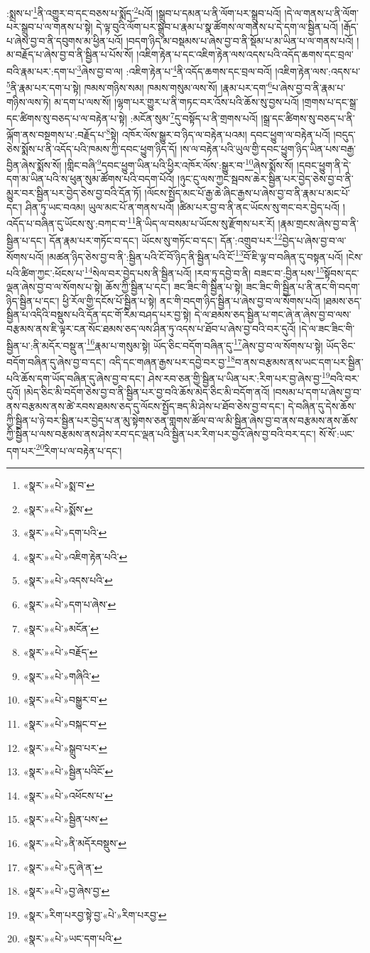 :སྨྲས་པ་\footnote{«སྣར་»«པེ་»སྨ་བ་}ནི་འགྱུར་བ་དང་བཅས་པ་སྨོད་\footnote{«སྣར་»«པེ་»སྨོས་}པའོ། །སྒྲུབ་པ་དམན་པ་ནི་ལོག་པར་སྒྲུབ་པའོ། །དེ་ལ་གནས་པ་ནི་ལོག་པར་སྒྲུབ་པ་ལ་གནས་པ་སྟེ། དེ་ལྟ་བུའི་ལོག་པར་སྒྲུབ་པ་རྣམ་པ་སྣ་ཚོགས་ལ་གནས་པ་དེ་དག་ལ་སྦྱིན་པའོ། །རྒོད་པ་ཞེས་བྱ་བ་ནི་དབུགས་མ་ཕྱིན་པའོ། །བདག་ཉིད་མ་བསྡམས་པ་ཞེས་བྱ་བ་ནི་སྡོམ་པ་མ་ཡིན་པ་ལ་གནས་པའོ། །མ་བརྗོད་པ་ཞེས་བྱ་བ་ནི་སྦྱིན་པ་པོས་སོ། །འཇིག་རྟེན་པ་དང་འཇིག་རྟེན་ལས་འདས་པའི་འདོད་ཆགས་དང་བྲལ་བའི་རྣམ་པར་:དག་པ་\footnote{«སྣར་»«པེ་»དག་པའི་}ཞེས་བྱ་བ་ལ། :འཇིག་རྟེན་པ་\footnote{«སྣར་»«པེ་»འཇིག་རྟེན་པའི་}ནི་འདོད་ཆགས་དང་བྲལ་བའོ། །འཇིག་རྟེན་ལས་:འདས་པ་\footnote{«སྣར་»«པེ་»འདས་པའི་}ནི་རྣམ་པར་དག་པ་སྟེ། ཁམས་གཉིས་སམ། ཁམས་གསུམ་ལས་སོ། །རྣམ་པར་དག་\footnote{«སྣར་»«པེ་»དག་པ་ཞེས་}པ་ཞེས་བྱ་བ་ནི་རྣམ་པ་གཉིས་ལས་ཏེ། མ་དག་པ་ལས་སོ། །ལྷག་པར་གྱུར་པ་ནི་གཏང་བར་འོས་པའི་ཆོས་སུ་བྱས་པའོ། །གྲགས་པ་དང་སྒྲ་དང་ཚིགས་སུ་བཅད་པ་ལ་བརྟེན་པ་སྟེ། :མངོན་སུམ་\footnote{«སྣར་»«པེ་»མངོན་}དུ་བསྟོད་པ་ནི་གྲགས་པའོ། །སྒྲ་དང་ཚིགས་སུ་བཅད་པ་ནི་ལྐོག་ནས་བསྔགས་པ་:བརྗོད་པ་\footnote{«སྣར་»«པེ་»བརྗོད་}སྟེ། འཁོར་ལོས་སྒྱུར་བ་ཉིད་ལ་བརྟེན་པའམ། དབང་ཕྱུག་ལ་བརྟེན་པའོ། །བདུད་ཅེས་སྨོས་པ་ནི་འདོད་པའི་ཁམས་ཀྱི་དབང་ཕྱུག་ཉིད་དོ། །ས་ལ་བརྟེན་པའི་ཡུལ་གྱི་དབང་ཕྱུག་ཉིད་ཡིན་པས་བརྒྱ་བྱིན་ཞེས་སྨོས་སོ། །གླིང་བཞི་\footnote{«སྣར་»«པེ་»གཞིའི་}དབང་ཕྱུག་ཡིན་པའི་ཕྱིར་འཁོར་ལོས་:སྒྱུར་བ་\footnote{«སྣར་»«པེ་»བསྒྱུར་བ་}ཞེས་སྨོས་སོ། །དབང་ཕྱུག་ནི་དེ་དག་མ་ཡིན་པའི་ས་ཕུན་སུམ་ཚོགས་པའི་བདག་པོའོ། །ཉུང་ངུ་ལས་ཀྱང་སྦབས་ཆེར་སྦྱིན་པར་བྱེད་ཅེས་བྱ་བ་ནི་མྱུར་བར་སྦྱིན་པར་བྱེད་ཅེས་བྱ་བའི་དོན་ཏོ། །ལོངས་སྤྱོད་མང་པོ་རྒྱ་ཆེ་ཞིང་རྒྱས་པ་ཞེས་བྱ་བ་ནི་རྣམ་པ་མང་པོ་དང་། ཤིན་ཏུ་ཡང་བའམ། ཡུལ་མང་པོ་ན་གནས་པའོ། །ཚིམ་པར་བྱ་བ་ནི་ནང་ཡོངས་སུ་གང་བར་བྱེད་པའོ། །འདོད་པ་བཞིན་དུ་ཡོངས་སུ་:བཀང་བ་\footnote{«སྣར་»«པེ་»བསྐང་བ་}ནི་ཡིད་ལ་བསམ་པ་ཡོངས་སུ་རྫོགས་པར་རོ། །རྣམ་གྲངས་ཞེས་བྱ་བ་ནི་སྦྱིན་པ་དང་། དོན་རྣམ་པར་གཏོང་བ་དང་། ཡོངས་སུ་གཏོང་བ་དང་། དོན་:འགྲུབ་པར་\footnote{«སྣར་»«པེ་»སྒྲུབ་པར་}བྱེད་པ་ཞེས་བྱ་བ་ལ་སོགས་པའོ། །མཚན་ཉིད་ཅེས་བྱ་བ་ནི་:སྦྱིན་པའི་ངོ་བོ་ཉིད་ནི་སྦྱིན་པའི་ངོ་\footnote{«སྣར་»«པེ་»སྦྱིན་པའིངོ་}བོ་ཇི་ལྟ་བ་བཞིན་དུ་བསྟན་པའོ། །ངེས་པའི་ཚིག་ཀྱང་:ཕོངས་པ་\footnote{«སྣར་»«པེ་»འཕོངས་པ་}སེལ་བར་བྱེད་པས་ནི་སྦྱིན་པའོ། །རབ་ཏུ་དབྱེ་བ་ནི། བཟང་བ་:བྱིན་པས་\footnote{«སྣར་»«པེ་»སྦྱིན་པས་}སྟོབས་དང་ལྡན་ཞེས་བྱ་བ་ལ་སོགས་པ་སྟེ། ཆོས་ཀྱི་སྦྱིན་པ་དང་། ཟང་ཟིང་གི་སྦྱིན་པ་སྟེ། ཟང་ཟིང་གི་སྦྱིན་པ་ནི་ནང་གི་བདག་ཉིད་སྦྱིན་པ་དང་། ཕྱི་རོལ་གྱི་དངོས་པོ་སྦྱིན་པ་སྟེ། ནང་གི་བདག་ཉིད་སྦྱིན་པ་ཞེས་བྱ་བ་ལ་སོགས་པའོ། །ཐམས་ཅད་སྦྱིན་པ་འདིའི་བསྡུས་པའི་དོན་དང་གོ་རིམ་བཤད་པར་བྱ་སྟེ། དེ་ལ་ཐམས་ཅད་སྦྱིན་པ་གང་ཞེ་ན་ཞེས་བྱ་བ་ལས་བརྩམས་ནས་ཇི་ལྟར་ངན་སོང་ཐམས་ཅད་ལས་ཤིན་ཏུ་འདས་པ་ཐོབ་པ་ཞེས་བྱ་བའི་བར་དུའོ། །དེ་ལ་ཟང་ཟིང་གི་སྦྱིན་པ་:ནི་མདོར་བསྡུ་ན་\footnote{«སྣར་»«པེ་»ནི་མདོརབསྡུས་}རྣམ་པ་གསུམ་སྟེ། ཡོད་ཅིང་བདོག་བཞིན་དུ་\footnote{«སྣར་»«པེ་»དུ་ཞེ་ན་}ཞེས་བྱ་བ་ལ་སོགས་པ་སྟེ། ཡོད་ཅིང་བདོག་བཞིན་དུ་ཞེས་བྱ་བ་དང་། འདི་དང་གཞན་རྒྱས་པར་དབྱེ་བར་བྱ་\footnote{«སྣར་»«པེ་»བྱ་ཞེས་བྱ་}བ་ནས་བརྩམས་ནས་ཡང་དག་པར་སྦྱིན་པའི་ཆོས་དག་ཡོད་བཞིན་དུ་ཞེས་བྱ་བ་དང་། ཤེས་རབ་ཅན་གྱི་སྦྱིན་པ་ཡིན་པར་:རིག་པར་བྱ་ཞེས་བྱ་\footnote{«སྣར་»རིག་པརབྱ་སྟེ་བྱ་«པེ་»རིག་པརབྱ་}བའི་བར་དུའོ། །མེད་ཅིང་མི་བདོག་ཅེས་བྱ་བ་ནི་སྦྱིན་པར་བྱ་བའི་ཆོས་མེད་ཅིང་མི་བདོག་ནའོ། །བསམ་པ་དག་པ་ཞེས་བྱ་བ་ནས་བརྩམས་ནས་ཚེ་རབས་ཐམས་ཅད་དུ་ལོངས་སྤྱོད་ཟད་མི་ཤེས་པ་ཐོབ་ཅེས་བྱ་བ་དང་། དེ་བཞིན་དུ་དེས་ཆོས་ཀྱི་སྦྱིན་པ་ཉེ་བར་སྦྱིན་པར་བྱེད་པ་ན་མུ་སྟེགས་ཅན་གླགས་ཚོལ་བ་ལ་མི་སྦྱིན་ཞེས་བྱ་བ་ནས་བརྩམས་ནས་ཆོས་ཀྱི་སྦྱིན་པ་ལས་བརྩམས་ནས་ཤེས་རབ་དང་ལྡན་པའི་སྦྱིན་པར་རིག་པར་བྱའོ་ཞེས་བྱ་བའི་བར་དང་། སོ་སོ་:ཡང་དག་པར་\footnote{«སྣར་»«པེ་»ཡང་དག་པའི་}རིག་པ་ལ་བརྟེན་པ་དང་། 